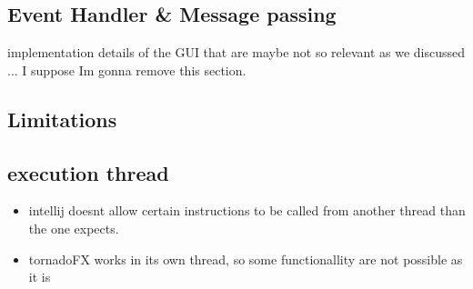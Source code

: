 
		\subsection{Event Handler \& Message passing}
		implementation details of the GUI that are maybe not so relevant as we discussed ... I suppose Im gonna remove this section.




	\subsection{Limitations}


		\subsection{execution thread}
		\begin{itemize}
			\item intellij doesnt allow certain instructions to be called from another thread than the one expects.
			\item tornadoFX works in its own thread, so some functionallity are not possible as it is
		\end{itemize}
